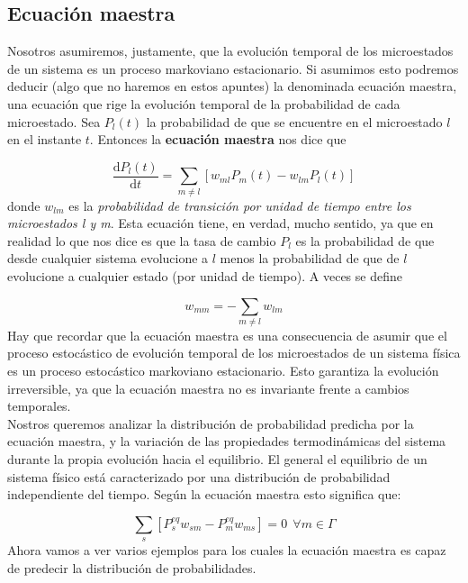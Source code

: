 \documentclass[12pt,a4paper]{article}
\numberwithin{equation}{section}
\numberwithin{figure}{section}
\newcommand{\ccorchetes}[1]{\left[ #1  \right]}
\newcommand{\D}{\mathrm{d}}
\newcommand{\derivadas}[2]{\frac{\D #1}{\D #2}}
\theoremstyle{definition}
\begin{document}
\subsection{Ecuación maestra}

Nosotros asumiremos, justamente, que la evolución temporal de los microestados de un sistema es un proceso markoviano estacionario. Si asumimos esto podremos deducir (algo que no haremos en estos apuntes) la denominada ecuación maestra, una ecuación que rige la evolución temporal de la probabilidad de cada microestado. Sea $P_l(t)$ la probabilidad de que se encuentre en el microestado $l$ en el instante $t$. Entonces la \textbf{ecuación maestra} nos dice que

\begin{equation}
\derivadas{P_l(t)}{t} = \sum_{m \neq l} \ccorchetes{w_{ml} P_m (t) - w_{lm} P_l (t)} 
\end{equation}
donde $w_{lm}$ es la \textit{probabilidad de transición por unidad de tiempo entre los microestados l y m}. Esta ecuación tiene, en verdad, mucho sentido, ya que en realidad lo que nos dice es que la tasa de cambio $P_l$ es la probabilidad de que desde cualquier sistema evolucione a $l$ menos la probabilidad de que de $l$ evolucione a cualquier estado (por unidad de tiempo). A veces se define

\begin{equation}
w_{mm} = - \sum_{m\neq l} w_{lm}
\end{equation}
Hay que recordar que la ecuación maestra es una consecuencia de asumir que el proceso estocástico de evolución temporal de los microestados de un sistema física es un proceso estocástico markoviano estacionario. Esto garantiza la evolución irreversible, ya que la ecuación maestra no es invariante frente a cambios temporales. \\

Nostros queremos analizar la distribución de probabilidad predicha por la ecuación maestra, y la variación de las propiedades termodinámicas del sistema durante la propia evolución hacia el equilibrio. El general el equilibrio de un sistema físico está caracterizado por una distribución de probabilidad independiente del tiempo. Según la ecuación maestra esto significa que:

\begin{equation}
\sum_s \ccorchetes{ P_s^{eq} w_{sm} - P_m^{eq} w_{ms}} = 0 \ \ \forall m \in \Gamma
\end{equation}
Ahora vamos a ver varios ejemplos para los cuales la ecuación maestra es capaz de predecir la distribución de probabilidades.
\end{document}
